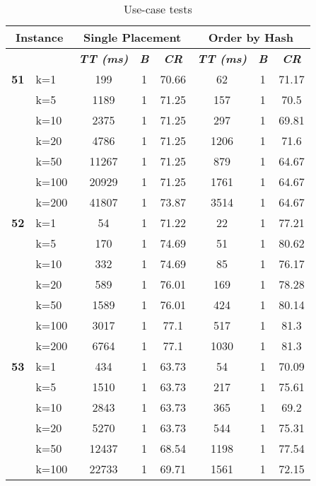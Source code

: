     \begin{table}[htbp]
    \caption{Use-case tests}
    \centering
    \begin{tabular}{|l|l|c|c|c|c|c|c|}
    
    \multicolumn{ 2}{|c|}{\textbf{Instance}} & \multicolumn{ 3}{c|}{\textbf{Single Placement}} & \multicolumn{ 3}{c|}{\textbf{Order by Hash}} \\ \hline
    \multicolumn{ 2}{|l|}{} & \textbf{\textit{TT (ms)}} & \textbf{\textit{B}} & \textbf{\textit{CR}} & \textbf{\textit{TT (ms)}} & \textbf{\textit{B}} & \textbf{\textit{CR}} \\ \hline
    \multicolumn{1}{|r|}{\textbf{51}} & k=1 & 199 & 1 & 70.66 & 62 & 1 & 71.17 \\ 
     & k=5 & 1189 & 1 & 71.25 & 157 & 1 & 70.5 \\ 
     & k=10 & 2375 & 1 & 71.25 & 297 & 1 & 69.81 \\ 
     & k=20 & 4786 & 1 & 71.25 & 1206 & 1 & 71.6 \\ 
     & k=50 & 11267 & 1 & 71.25 & 879 & 1 & 64.67 \\ 
     & k=100 & 20929 & 1 & 71.25 & 1761 & 1 & 64.67 \\ 
     & k=200 & 41807 & 1 & 73.87 & 3514 & 1 & 64.67 \\ \hline
    \multicolumn{1}{|r|}{\textbf{52}} & k=1 & 54 & 1 & 71.22 & 22 & 1 & 77.21 \\ 
     & k=5 & 170 & 1 & 74.69 & 51 & 1 & 80.62 \\ 
     & k=10 & 332 & 1 & 74.69 & 85 & 1 & 76.17 \\ 
     & k=20 & 589 & 1 & 76.01 & 169 & 1 & 78.28 \\ 
     & k=50 & 1589 & 1 & 76.01 & 424 & 1 & 80.14 \\ 
     & k=100 & 3017 & 1 & 77.1 & 517 & 1 & 81.3 \\ 
     & k=200 & 6764 & 1 & 77.1 & 1030 & 1 & 81.3 \\ \hline
    \multicolumn{1}{|r|}{\textbf{53}} & k=1 & 434 & 1 & 63.73 & 54 & 1 & 70.09 \\ 
     & k=5 & 1510 & 1 & 63.73 & 217 & 1 & 75.61 \\ 
     & k=10 & 2843 & 1 & 63.73 & 365 & 1 & 69.2 \\ 
     & k=20 & 5270 & 1 & 63.73 & 544 & 1 & 75.31 \\ 
     & k=50 & 12437 & 1 & 68.54 & 1198 & 1 & 77.54 \\ 
     & k=100 & 22733 & 1 & 69.71 & 1561 & 1 & 72.15 \\ 

\end{tabular}
\end{table}

